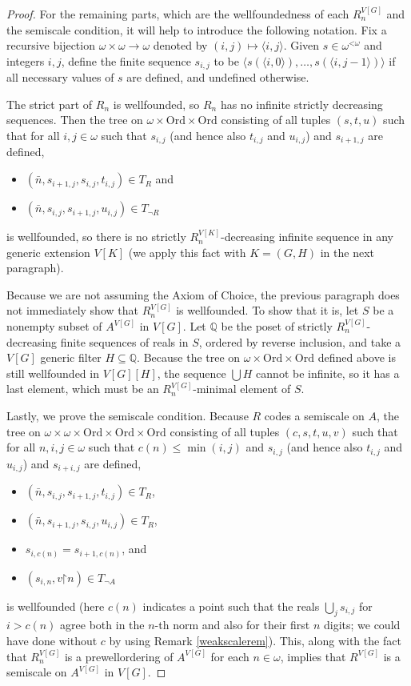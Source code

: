 \documentclass[fleqn, 11pt]{amsart}
\theoremstyle{plain}
\theoremstyle{definition}
\theoremstyle{remark}
\newcommand{\Ord}{\mathrm{Ord}}
\newcommand{\restrict}{\mathord{\restriction}}
\newcommand{\less}{\mathord{<}}
\begin{document}
\begin{proof}
For the remaining parts, which are the wellfoundedness of each $R^{V[G]}_n$ and the 
semiscale condition, it will help to introduce the following notation.
Fix a recursive bijection $\omega \times \omega \to \omega$ denoted by $(i, j) \mapsto \langle i, j \rangle$.
Given
$s \in \omega^{\less\omega}$ and integers $i,j$, define the finite sequence
$s_{i,j}$ to be $\langle s(\langle i, 0\rangle), \ldots, s(\langle i, j-1\rangle)\rangle$
if all necessary values of $s$ are defined, and undefined otherwise.


The strict part of $R_n$ is wellfounded, so $R_n$ has no infinite strictly decreasing sequences.
 Then the tree on $\omega \times \Ord \times \Ord$ consisting of all tuples $(s, t, u)$
 such that for all $i,j \in \omega$ such that $s_{i,j}$ (and hence also $t_{i,j}$ and $u_{i,j}$) and $s_{i+1,j}$ are defined,
\begin{itemize}
 \item $(\bar{n}, s_{i+1, j}, s_{i,j}, t_{i,j}) \in T_R$ and
 \item $(\bar{n}, s_{i,j}, s_{i+1,j}, u_{i,j}) \in T_{\neg R}$
\end{itemize}
 is wellfounded, so there is no strictly $R^{V[K]}_n$-decreasing infinite sequence in any generic extension $V[K]$ (we apply this fact with $K = (G,H)$ in the next paragraph).

Because we are not assuming the Axiom of Choice, the previous paragraph does not immediately show that
 $R^{V[G]}_n$ is wellfounded.  
 To show that it is, let $S$ be a nonempty subset of $A^{V[G]}$ in $V[G]$.
 Let $\mathbb{Q}$ be the poset of strictly $R^{V[G]}_n$-decreasing finite sequences
 of reals in $S$, ordered by reverse inclusion,
 and take a $V[G]$ generic filter $H \subseteq \mathbb{Q}$.
 Because the tree on $\omega \times \Ord \times \Ord$
 defined above is still wellfounded in $V[G][H]$,
 the sequence
 $\bigcup H$ cannot be infinite, so it has a last element, which must be
 an $R^{V[G]}_n$-minimal element of $S$.

Lastly, we prove the semiscale condition.
Because $R$ codes a semiscale
on $A$, the tree on $\omega \times \omega \times \Ord \times \Ord \times \Ord$ consisting of all tuples
$(c, s, t, u, v)$ such that
for all $n,i,j \in \omega$ such that $c(n) \le \min(i,j)$ and
$s_{i,j}$ (and hence also $t_{i,j}$ and $u_{i,j}$) and $s_{i+i,j}$
are defined, 
\begin{itemize}
 \item $(\bar{n}, s_{i,j}, s_{i+1,j}, t_{i,j}) \in T_R$,
 \item $(\bar{n}, s_{i+1,j}, s_{i,j}, u_{i,j}) \in T_R$,
 \item $s_{i,c(n)} = s_{i+1,c(n)}$, and
 \item $(s_{i,n}, v \restrict n) \in T_{\neg A}$
\end{itemize}
is wellfounded (here $c(n)$ indicates a point such that the reals $\bigcup_{j}s_{i,j}$ for $i > c(n)$ agree both in the $n$-th norm and also for their first $n$ digits; we could have done without $c$ by using Remark \ref{weakscalerem}).  This, along with the fact that $R^{V[G]}_n$ is a prewellordering of $A^{V[G]}$ for each $n \in \omega$, implies that $R^{V[G]}$ is a semiscale on $A^{V[G]}$ in $V[G]$.
\end{proof}
\end{document}
